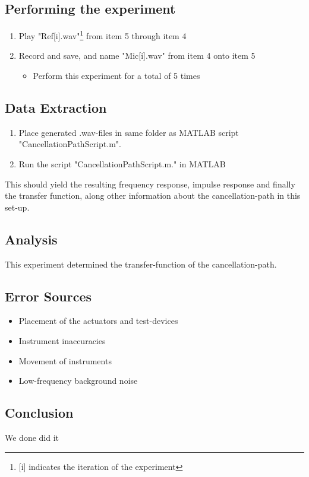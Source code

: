 \subsection{Performing the experiment}
\begin{enumerate}
	\item Play "Ref[i].wav"\footnote{[i] indicates the iteration of the experiment} from item 5 through item 4
	\item Record and save, and name "Mic[i].wav" from item 4 onto item 5
	\begin{itemize}
		\item[] Perform this experiment for a total of 5 times
	\end{itemize}
\end{enumerate}

\subsection{Data Extraction}
\begin{enumerate}
	\item Place generated .wav-files in same folder as MATLAB\textsuperscript{\textregistered} script "CancellationPathScript.m".
	\item Run the script "CancellationPathScript.m." in MATLAB\textsuperscript{\textregistered}
\end{enumerate}
This should yield the resulting frequency response, impulse response and finally the transfer function, along other information about the cancellation-path in this set-up.

\subsection{Analysis}
This experiment determined the transfer-function of the cancellation-path.

\subsection{Error Sources}
\begin{itemize}
	\item Placement of the actuators and test-devices
	\item Instrument inaccuracies 
	\item Movement of instruments
	\item Low-frequency background noise
\end{itemize}

\subsection{Conclusion}
We done did it